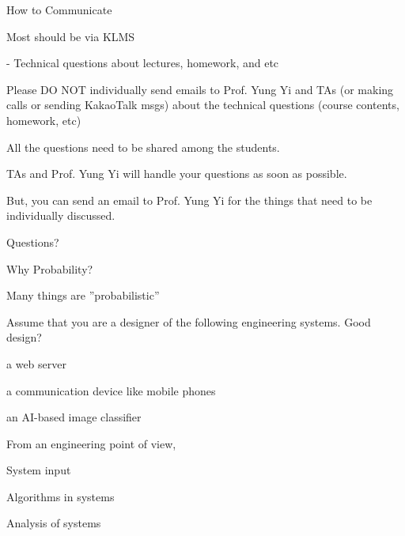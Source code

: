 \documentclass[fleqn,aspectratio=169]{beamer}
\begin{document}
\begin{frame}{How to Communicate}

\bci

\item Most should be via KLMS

- Technical questions about lectures, homework, and etc

\item Please DO NOT individually send emails to Prof. Yung Yi and TAs (or making calls or sending KakaoTalk msgs) about the technical questions (course contents, homework, etc)

\bci
\item  All the questions need to be shared among the students.

\item TAs and Prof. Yung Yi will handle your questions as soon as possible.

\item  But, you can send an email to Prof. Yung Yi for the things that need to be individually discussed.
\eci
\eci

\end{frame}


\begin{frame}{}
\vspace{2cm}
\LARGE Questions?
\end{frame}


\begin{frame}{Why Probability?}

\bci

\item<1-> Many things are ''probabilistic''

\item<2-> Assume that you are a designer of the following engineering systems. Good design?

\bci
\item a web server

\item  a communication device like mobile phones

\item an AI-based image classifier 
\eci

\item<3-> From an engineering point of view,

\bci
\item System input

\item Algorithms in systems

\item Analysis of systems
\eci

\eci

\end{frame}
\end{document}
